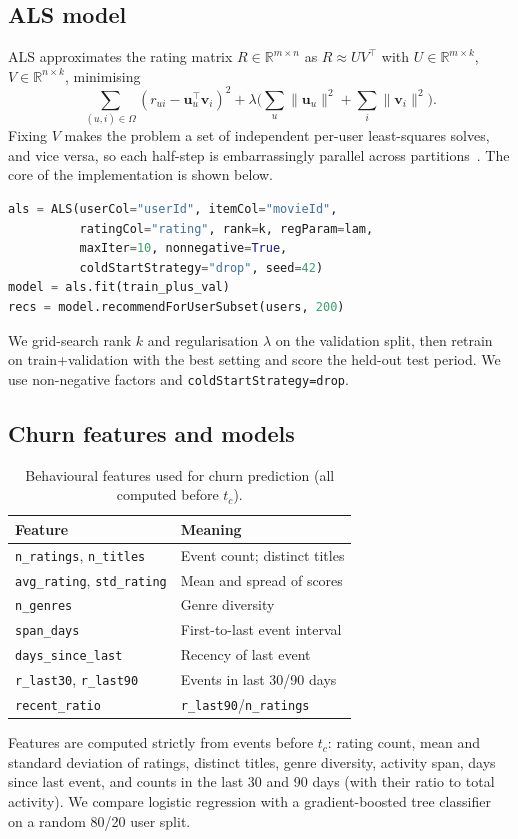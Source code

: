 \documentclass[conference]{IEEEtran}
\begin{document}
\subsection{ALS model}
ALS approximates the rating matrix $R\in\mathbb{R}^{m\times n}$ as $R\approx UV^{\top}$ with $U\in\mathbb{R}^{m\times k}$, $V\in\mathbb{R}^{n\times k}$, minimising
\begin{equation}
\sum_{(u,i)\in\Omega}\!\left(r_{ui}-\mathbf{u}_u^{\top}\mathbf{v}_i\right)^2+\lambda\Big(\sum_u\lVert\mathbf{u}_u\rVert^2+\sum_i\lVert\mathbf{v}_i\rVert^2\Big).
\end{equation}
Fixing $V$ makes the problem a set of independent per-user least-squares solves, and vice versa, so each half-step is embarrassingly parallel across partitions~\cite{zhou,mllib}. The core of the implementation is shown below.
\begin{lstlisting}[language=Python]
als = ALS(userCol="userId", itemCol="movieId",
          ratingCol="rating", rank=k, regParam=lam,
          maxIter=10, nonnegative=True,
          coldStartStrategy="drop", seed=42)
model = als.fit(train_plus_val)
recs = model.recommendForUserSubset(users, 200)
\end{lstlisting}
We grid-search rank $k$ and regularisation $\lambda$ on the validation split, then retrain on train+validation with the best setting and score the held-out test period. We use non-negative factors and \texttt{coldStartStrategy=drop}.

\subsection{Churn features and models}
\begin{table}[t]
\caption{Behavioural features used for churn prediction (all computed before $t_c$).}
\label{tab:feat}
\centering
\small
\begin{tabular}{ll}
\toprule
Feature & Meaning \\
\midrule
\texttt{n\_ratings}, \texttt{n\_titles} & Event count; distinct titles \\
\texttt{avg\_rating}, \texttt{std\_rating} & Mean and spread of scores \\
\texttt{n\_genres} & Genre diversity \\
\texttt{span\_days} & First-to-last event interval \\
\texttt{days\_since\_last} & Recency of last event \\
\texttt{r\_last30}, \texttt{r\_last90} & Events in last 30/90 days \\
\texttt{recent\_ratio} & \texttt{r\_last90}/\texttt{n\_ratings} \\
\bottomrule
\end{tabular}
\end{table}
Features are computed strictly from events before $t_c$: rating count, mean and standard deviation of ratings, distinct titles, genre diversity, activity span, days since last event, and counts in the last 30 and 90 days (with their ratio to total activity). We compare logistic regression with a gradient-boosted tree classifier~\cite{friedman} on a random 80/20 user split.
\end{document}
